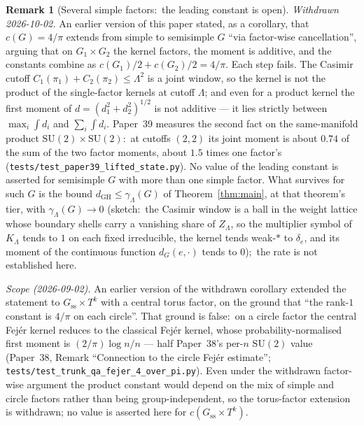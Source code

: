 \documentclass[11pt,a4paper]{article}
\theoremstyle{plain}
\theoremstyle{definition}
\newtheorem{remark}[theorem]{Remark}
\newcommand{\Lammax}{\Lambda}
\newcommand{\SU}{\mathrm{SU}}
\newcommand{\Cas}{C}
\newcommand{\KS}{K}
\begin{document}
\begin{remark}[Several simple factors:\ the leading constant is
open]\label{cor:general_compact_connected}
\emph{Withdrawn 2026-10-02.} An earlier version of this paper stated, as
a corollary, that $c(G) = 4/\pi$ extends from simple to semisimple $G$
``via factor-wise cancellation'', arguing that on $G_1 \times G_2$ the
kernel factors, the moment is additive, and the constants combine as
$c(G_1)/2 + c(G_2)/2 = 4/\pi$.  Each step fails.  The Casimir cutoff
$\Cas_1(\pi_1) + \Cas_2(\pi_2) \le \Lammax^2$ is a joint window, so the
kernel is not the product of the single-factor kernels at cutoff
$\Lammax$; and even for a product kernel the first moment of
$d = (d_1^2 + d_2^2)^{1/2}$ is not additive --- it lies strictly
between $\max_i \int d_i$ and $\sum_i \int d_i$.  Paper~39 measures the
second fact on the same-manifold product $\SU(2) \times \SU(2)$:\ at
cutoffs $(2,2)$ its joint moment is about $0.74$ of the sum of the two
factor moments, about $1.5$ times one factor's
(\texttt{tests/test\_paper39\_lifted\_state.py}).  No value of the
leading constant is asserted for semisimple $G$ with more than one
simple factor.  What survives for such $G$ is the bound
$d_{\mathrm{GH}} \le \gamma_\Lammax(G)$ of Theorem~\ref{thm:main}, at
that theorem's tier, with $\gamma_\Lammax(G) \to 0$ (sketch:\ the
Casimir window is a ball in the weight lattice whose boundary shells
carry a vanishing share of $Z_\Lammax$, so the multiplier symbol of
$\KS_\Lammax$ tends to $1$ on each fixed irreducible, the kernel tends
weak-$*$ to $\delta_e$, and its moment of the continuous function
$d_G(e,\cdot)$ tends to $0$);\ the rate is not established here.

\emph{Scope (2026-09-02).} An earlier version of the withdrawn corollary
extended the statement to $G_{\mathrm{ss}} \times T^k$ with a central
torus factor, on the ground that ``the rank-$1$ constant is $4/\pi$ on
each circle''. That ground is false:\ on a circle factor the central
Fej\'er kernel reduces to the classical Fej\'er kernel, whose
probability-normalised first moment is $(2/\pi)\log n / n$ --- half
Paper~38's per-$n$ $\SU(2)$ value (Paper~38, Remark ``Connection to the circle Fej\'er
estimate''; \texttt{tests/test\_trunk\_qa\_fejer\_4\_over\_pi.py}). Even
under the withdrawn factor-wise argument the product constant would depend
on the mix of simple and circle factors rather than being group-independent,
so the torus-factor extension is withdrawn; no value is asserted here
for $c(G_{\mathrm{ss}} \times T^k)$.
\end{remark}
\end{document}
